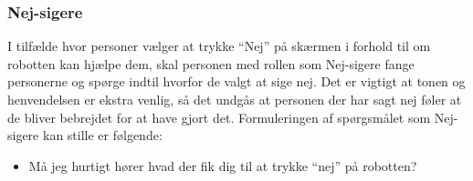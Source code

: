 \subsubsection*{Nej-sigere}
I tilfælde hvor personer vælger at trykke ``Nej'' på skærmen i forhold til om robotten kan hjælpe dem, skal personen med rollen som Nej-sigere fange personerne og spørge indtil hvorfor de valgt at sige nej. Det er vigtigt at tonen og henvendelsen er ekstra venlig, så det undgås at personen der har sagt nej føler at de bliver bebrejdet for at have gjort det. Formuleringen af spørgsmålet som Nej-sigere kan stille er følgende: 
\begin{itemize}
	\item Må jeg hurtigt hører hvad der fik dig til at trykke ``nej'' på robotten? 
\end{itemize}